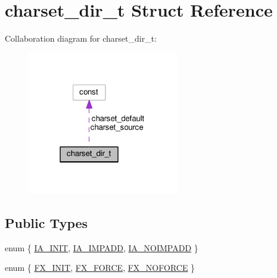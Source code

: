 \hypertarget{structcharset__dir__t}{}\section{charset\+\_\+dir\+\_\+t Struct Reference}
\label{structcharset__dir__t}


Collaboration diagram for charset\+\_\+dir\+\_\+t\+:
\nopagebreak
\begin{figure}[H]
\begin{center}
\leavevmode
\includegraphics[width=187pt]{structcharset__dir__t__coll__graph}
\end{center}
\end{figure}
\subsection*{Public Types}
\begin{DoxyCompactItemize}
\item 
enum \{ \hyperlink{structcharset__dir__t_a1f5f036d96d58c9aba19dcfac54a3106a9b68b75d7e30185c1d999f2a5e0fd174}{I\+A\+\_\+\+I\+N\+IT}, 
\hyperlink{structcharset__dir__t_a1f5f036d96d58c9aba19dcfac54a3106a395de616ce13b6bc52252575e49fbeed}{I\+A\+\_\+\+I\+M\+P\+A\+DD}, 
\hyperlink{structcharset__dir__t_a1f5f036d96d58c9aba19dcfac54a3106aa2d7f6d774b44ca4524e71c98c6dca5b}{I\+A\+\_\+\+N\+O\+I\+M\+P\+A\+DD}
 \}
\item 
enum \{ \hyperlink{structcharset__dir__t_aa89e54fae8b7517397d11b1d265b4f69a2c646cea18eae788f189af1ffd08374c}{F\+X\+\_\+\+I\+N\+IT}, 
\hyperlink{structcharset__dir__t_aa89e54fae8b7517397d11b1d265b4f69aca7ca3ee4a4edd23e238593a874ccdf9}{F\+X\+\_\+\+F\+O\+R\+CE}, 
\hyperlink{structcharset__dir__t_aa89e54fae8b7517397d11b1d265b4f69a5cc1c7f9975745c355b474ff02b1478b}{F\+X\+\_\+\+N\+O\+F\+O\+R\+CE}
 \}
\end{DoxyCompactItemize}
